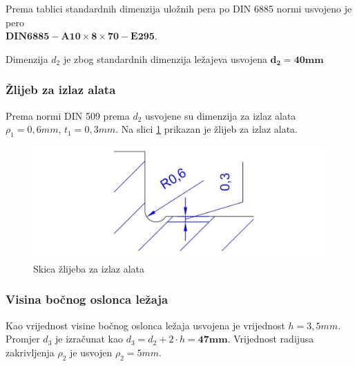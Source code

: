 \documentclass[12pt,a4paper]{article}
\begin{document}
Prema tablici standardnih dimenzija uložnih pera po DIN 6885 normi usvojeno je pero \\
$\mathbf{DIN6885-A 10 \times 8 \times 70-E295}$.

Dimenzija $d_2$ je zbog standardnih dimenzija ležajeva usvojena $\mathbf{d_2=40mm}$
\subsubsection*{Žlijeb za izlaz alata}
Prema normi DIN 509 prema $d_2$ usvojene su dimenzija za izlaz alata\\
$\rho_1=0,6mm$, $t_1=0,3mm$. Na slici \ref{izlazAlata} prikazan je žlijeb za izlaz alata.
\begin{figure}[H]
\centering
\includegraphics[width=1\textwidth]{izlazAlata}
\caption{Skica žlijeba za izlaz alata}\label{izlazAlata}
\end{figure}
\subsubsection*{Visina bočnog oslonca ležaja}
Kao vrijednost visine bočnog oslonca ležaja usvojena je vrijednost $h=3,5mm$.
Promjer $d_3$ je izračunat kao $d_3=d_2+2 \cdot h = \mathbf{47mm}$.
Vrijednost radijusa zakrivljenja $\rho_2$ je usvojen $\rho_2=5mm$.
\end{document}
